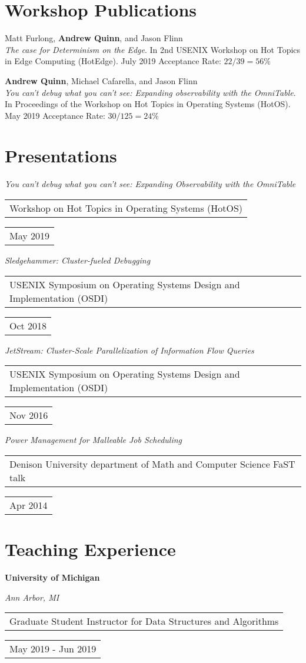 \documentclass[letterpaper,10pt]{article}
\newlength \firstcol
\newcommand{\reitem}[2]{
  \begin{tabular}{l}
    #2
  \end{tabular}
\hfill
\begin{tabular}{r}
  #1
\end{tabular}
}
\newcommand{\heading}[4]{
\vspace{#1}
\begin{minipage}{\firstcol}
\flushleft
\textbf{#2}
\end{minipage}
\null\hfill
\begin{minipage}{3.6cm}
\flushright
\textit{#3}
\end{minipage}
\vspace{#4}
}
\newcommand{\paper}[3]{#1\\#2 #3}
\newcommand{\presentation}[3]{
  \emph{#1}\\
  \reitem{#3}{#2}
  }
\begin{document}
\section{Workshop Publications}
\paper{Matt Furlong, \textbf{Andrew Quinn}, and Jason Flinn}
      {\emph{The case for Determinism on the Edge}.  In 2nd USENIX
        Workshop on Hot Topics in Edge Computing (HotEdge).  July
        2019}{Acceptance Rate: $22/39=56\%$}

\paper{\textbf{Andrew Quinn}, Michael Cafarella, and Jason
  Flinn}{\emph{You can't debug what you can't see: Expanding
    observability with the OmniTable}. In Proceedings of the Workshop
  on Hot Topics in Operating Systems (HotOS).  May 2019}{Acceptance
  Rate: $30/125=24\%$}

\section{Presentations}
\presentation{You can't debug what you can't see: Expanding
  Observability with the OmniTable}{Workshop on Hot Topics in
  Operating Systems (HotOS)}{May 2019}

\presentation{Sledgehammer: Cluster-fueled Debugging}{USENIX Symposium
  on Operating Systems Design and Implementation (OSDI)}{Oct 2018}

\presentation{JetStream: Cluster-Scale Parallelization of Information
  Flow Queries}{USENIX Symposium on Operating Systems Design and
  Implementation (OSDI)}{Nov 2016}

\presentation{Power Management for Malleable Job Scheduling}{Denison
  University department of Math and Computer Science FaST talk}{Apr 2014}

\section{Teaching Experience}
\heading{0em}{University of Michigan}{Ann Arbor, MI}{0em}
\reitem{May 2019 - Jun 2019}{Graduate Student Instructor for Data Structures and Algorithms}
\end{document}
